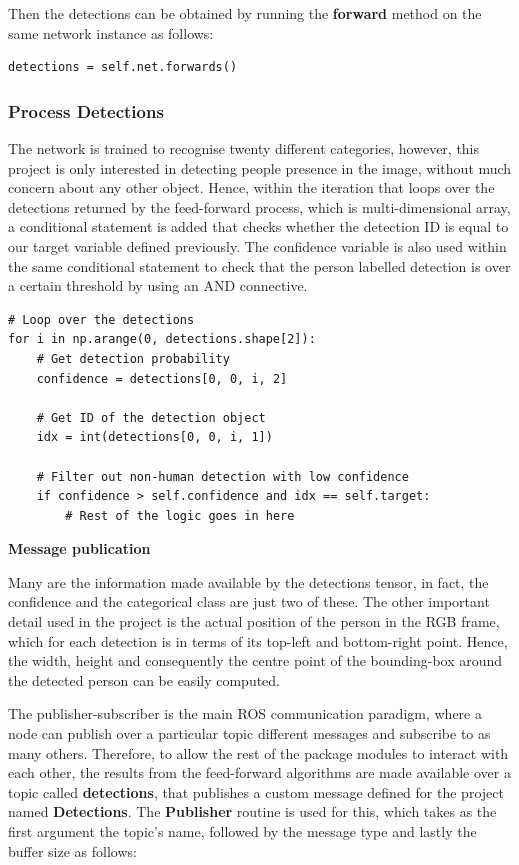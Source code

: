 Then the detections can be obtained by running the \textbf{forward} method on the same network instance as follows:

\begin{lstlisting}
detections = self.net.forwards()
\end{lstlisting}

\subsubsection{Process Detections}

The network is trained to recognise twenty different categories, however, this project is only interested in detecting people presence in the image, without much concern about any other object. Hence, within the iteration that loops over the detections returned by the feed-forward process, which is multi-dimensional array, a conditional statement is added that checks whether the detection ID is equal to our target variable defined previously. The confidence variable is also used within the same conditional statement to check that the person labelled detection is over a certain threshold by using an AND connective.

\begin{lstlisting}
# Loop over the detections
for i in np.arange(0, detections.shape[2]):
	# Get detection probability
	confidence = detections[0, 0, i, 2]

	# Get ID of the detection object
	idx = int(detections[0, 0, i, 1])

	# Filter out non-human detection with low confidence
	if confidence > self.confidence and idx == self.target:
    	# Rest of the logic goes in here
\end{lstlisting}

\textbf{Message publication}

Many are the information made available by the detections tensor, in fact, the confidence and the categorical class are just two of these. The other important detail used in the project is the actual position of the person in the RGB frame, which for each detection is in terms of its top-left and bottom-right point. Hence, the width, height and consequently the centre point of the bounding-box around the detected person can be easily computed.

The publisher-subscriber is the main ROS communication paradigm, where a node can publish over a particular topic different messages and subscribe to as many others. Therefore, to allow the rest of the package modules to interact with each other, the results from the feed-forward algorithms are made available over a topic called \textbf{detections}, that publishes a custom message defined for the project named \textbf{Detections}. The \textbf{Publisher} routine is used for this, which takes as the first argument the topic's name, followed by the message type and lastly the buffer size as follows:

